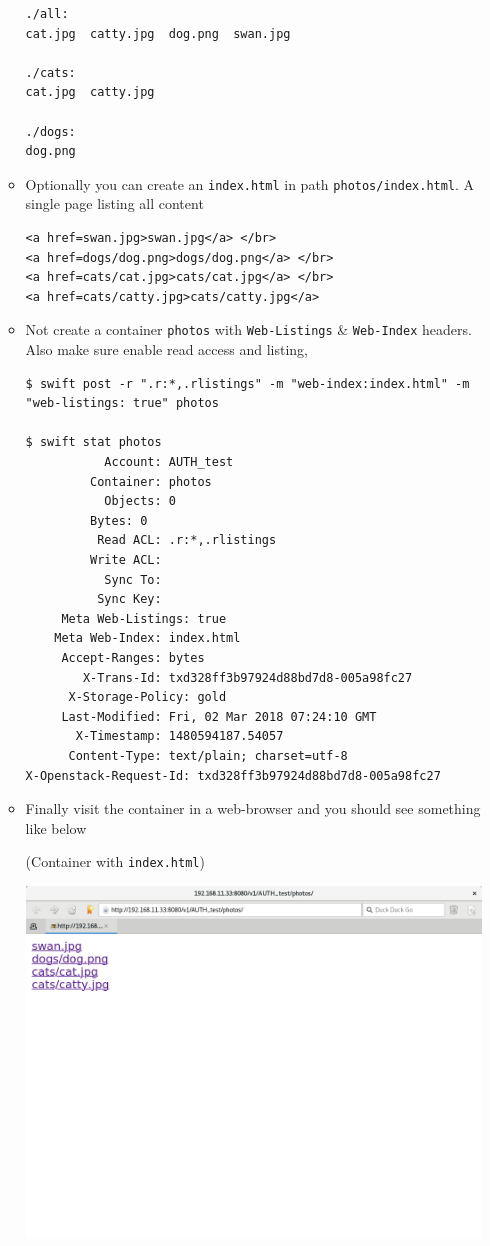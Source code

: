 \documentclass{article}
\begin{document}
\begin{itemize}
\begin{itemize}
\begin{verbatim}
./all:
cat.jpg  catty.jpg  dog.png  swan.jpg

./cats:
cat.jpg  catty.jpg

./dogs:
dog.png
\end{verbatim}

\item Optionally you can create an \texttt{index.html} in path
\texttt{photos/index.html}. A single page listing all content
\begin{verbatim}
<a href=swan.jpg>swan.jpg</a> </br>
<a href=dogs/dog.png>dogs/dog.png</a> </br>
<a href=cats/cat.jpg>cats/cat.jpg</a> </br>
<a href=cats/catty.jpg>cats/catty.jpg</a>
\end{verbatim}

\item Not create a container \texttt{photos} with \texttt{Web-Listings} \& \texttt{Web-Index}
headers. Also make sure enable read access and listing,
\begin{verbatim}
$ swift post -r ".r:*,.rlistings" -m "web-index:index.html" -m "web-listings: true" photos

$ swift stat photos
	       Account: AUTH_test
	     Container: photos
	       Objects: 0
		 Bytes: 0
	      Read ACL: .r:*,.rlistings
	     Write ACL:
	       Sync To:
	      Sync Key:
     Meta Web-Listings: true
	Meta Web-Index: index.html
	 Accept-Ranges: bytes
	    X-Trans-Id: txd328ff3b97924d88bd7d8-005a98fc27
      X-Storage-Policy: gold
	 Last-Modified: Fri, 02 Mar 2018 07:24:10 GMT
	   X-Timestamp: 1480594187.54057
	  Content-Type: text/plain; charset=utf-8
X-Openstack-Request-Id: txd328ff3b97924d88bd7d8-005a98fc27
\end{verbatim}

\item Finally visit the container in a web-browser and you should see
something like below

(Container with \texttt{index.html})
\begin{center}
\includegraphics[width=.9\linewidth]{./img/container_listing.png}
\end{center}


\end{itemize}
\end{itemize}
\end{document}
